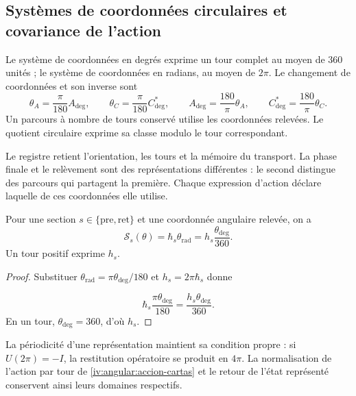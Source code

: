 \subsection{Systèmes de coordonnées circulaires et covariance de l’action}
\label{iv:angular:cartas}

\begin{definition}
\label{iv:angular:unidades}
Le système de coordonnées en degrés exprime un tour complet au moyen de \(360\)
unités ; le système de coordonnées en radians, au moyen de \(2\pi\). Le changement
de coordonnées et son inverse sont
\begin{equation}
 \theta_A=\frac{\pi}{180}A_{\deg},\qquad
 \theta_C=\frac{\pi}{180}C^*_{\deg},\qquad
 A_{\deg}=\frac{180}{\pi}\theta_A,\qquad
 C^*_{\deg}=\frac{180}{\pi}\theta_C.
 \label{iv:angular:cambio-carta}
\end{equation}
Un parcours à nombre de tours conservé utilise les
coordonnées relevées. Le quotient circulaire exprime sa
classe modulo le tour correspondant.
\end{definition}

Le registre retient l’orientation, les tours et la mémoire du transport.
La phase finale et le relèvement sont des représentations différentes :
le second distingue des parcours qui partagent la première.
Chaque expression d’action déclare laquelle de ces coordonnées elle utilise.

\begin{proposition}
\label{iv:angular:accion}
Pour une section \(s\in\{\mathrm{pre},\mathrm{ret}\}\) et une
coordonnée angulaire relevée, on a
\begin{equation}
 \mathcal S_s(\theta)
 =\hbar_s\theta_{\mathrm{rad}}
 =h_s\frac{\theta_{\deg}}{360}.
 \label{iv:angular:accion-cartas}
\end{equation}
Un tour positif exprime \(h_s\).
\end{proposition}
\begin{proof}
Substituer
\(\theta_{\mathrm{rad}}=\pi\theta_{\deg}/180\) et
\(h_s=2\pi\hbar_s\) donne

\[
 \hbar_s\frac{\pi\theta_{\deg}}{180}
 =\frac{h_s\theta_{\deg}}{360}.
\]
En un tour, \(\theta_{\deg}=360\), d’où \(h_s\).

\end{proof}

La périodicité d’une représentation maintient sa condition
propre : si \(U(2\pi)=-I\), la restitution opératoire se produit
en \(4\pi\). La normalisation de l’action par tour de
\eqref{iv:angular:accion-cartas} et le retour de l’état
représenté conservent ainsi leurs domaines respectifs.

